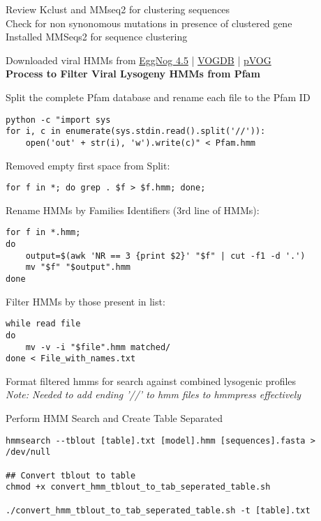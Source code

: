 \documentclass[idxtotoc,hyperref,openany]{labbook} %
\begin{document}
Review Kclust and MMseq2 for clustering sequences \\

Check for non synonomous mutations in presence of clustered gene \\

Installed MMSeqs2 for sequence clustering

Downloaded viral HMMs from \href{http://eggnogdb.embl.de/#/app/viruses}{EggNog 4.5}  |  \href{http://vogdb.org/download}{VOGDB}  | \href{http://dmk-brain.ecn.uiowa.edu/pVOGs/downloads.html}{pVOG} \\

\textbf{Process to Filter Viral Lysogeny HMMs from Pfam}

Split the complete Pfam database and rename each file to the Pfam ID 

\begin{verbatim}
python -c "import sys
for i, c in enumerate(sys.stdin.read().split('//')):
    open('out' + str(i), 'w').write(c)" < Pfam.hmm
\end{verbatim}

Removed empty first space from Split:
\begin{verbatim}
for f in *; do grep . $f > $f.hmm; done;
\end{verbatim}

Rename HMMs by Families Identifiers (3rd line of HMMs):
\begin{verbatim}
for f in *.hmm; 
do 
	output=$(awk 'NR == 3 {print $2}' "$f" | cut -f1 -d '.')
	mv "$f" "$output".hmm
done
\end{verbatim}

Filter HMMs by those present in list:
\begin{verbatim}
while read file
do
	mv -v -i "$file".hmm matched/
done < File_with_names.txt
\end{verbatim}

Format filtered hmms for search against combined lysogenic profiles \\
\textit{Note: Needed to add ending '//' to hmm files to hmmpress effectively}

Perform HMM Search and Create Table Separated
\begin{verbatim}
hmmsearch --tblout [table].txt [model].hmm [sequences].fasta > /dev/null

## Convert tblout to table
chmod +x convert_hmm_tblout_to_tab_seperated_table.sh

./convert_hmm_tblout_to_tab_seperated_table.sh -t [table].txt 
\end{verbatim}
\end{document}
